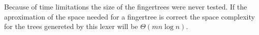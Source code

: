 Because of time limitations the size of the fingertrees were never tested. If
the aproximation of the space needed for a fingertree is correct the space
complexity for the trees genereted by this lexer will be $\Theta(mn\log n)$.

